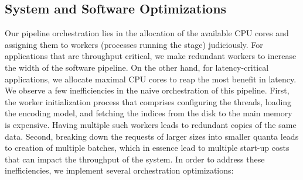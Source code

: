 %



\subsection{System and Software Optimizations}
\label{sec:Design:Software}
Our pipeline orchestration lies in the allocation of the available CPU cores and assigning them to workers (processes running the stage) judiciously. For applications that are throughput critical, we make redundant workers to increase the width of the software pipeline. On the other hand, for latency-critical applications, we allocate maximal CPU cores to reap the most benefit in latency. We observe a few inefficiencies in the naive orchestration of this pipeline. First, the worker initialization process that comprises configuring the threads, loading the encoding model, and fetching the indices from the disk to the main memory is expensive. Having multiple such workers leads to redundant copies of the same data. Second, breaking down the requests of larger sizes into smaller quanta leads to creation of multiple batches, which in essence lead to multiple start-up costs that can impact the throughput of the system. In order to address these inefficiencies, we implement several orchestration optimizations:

